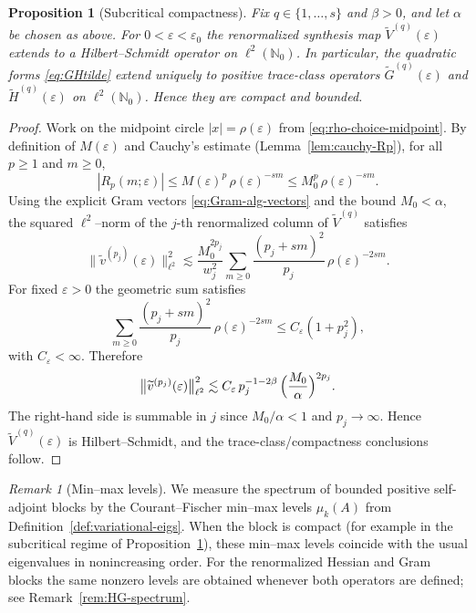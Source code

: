 \documentclass[11pt]{amsart}
\numberwithin{equation}{section}
\theoremstyle{plain}
\newtheorem{proposition}[theorem]{Proposition}
\theoremstyle{definition}
\theoremstyle{remark}
\newtheorem{remark}[theorem]{Remark}
\newcommand{\N}{\mathbb{N}}
\begin{document}
\begin{proposition}[Subcritical compactness]\label{prop:subcrit-compact}
	Fix $q\in\{1,\dots,s\}$ and $\beta>0$, and let $\alpha$ be chosen as above.
	For $0<\varepsilon<\varepsilon_0$ the renormalized synthesis map
	$\widetilde V^{(q)}(\varepsilon)$ extends to a Hilbert--Schmidt operator on $\ell^2(\N_0)$.
	In particular, the quadratic forms \eqref{eq:GHtilde} extend uniquely to positive trace-class operators
	$\widetilde G^{(q)}(\varepsilon)$ and $\widetilde H^{(q)}(\varepsilon)$ on $\ell^2(\N_0)$. Hence they are compact and bounded.
\end{proposition}

\begin{proof}
	Work on the midpoint circle $|x|=\rho(\varepsilon)$ from \eqref{eq:rho-choice-midpoint}.
	By definition of $M(\varepsilon)$ and Cauchy's estimate (Lemma~\ref{lem:cauchy-Rp}),
	for all $p\ge1$ and $m\ge0$,
	\[
		|R_p(m;\varepsilon)|
		\le M(\varepsilon)^p\,\rho(\varepsilon)^{-sm}
		\le M_0^p\,\rho(\varepsilon)^{-sm}.
	\]
	Using the explicit Gram vectors \eqref{eq:Gram-alg-vectors} and the bound $M_0<\alpha$,
	the squared $\ell^2$--norm of the $j$-th renormalized column of $\widetilde V^{(q)}$ satisfies
	\[
		\bigl\|\widetilde v^{(p_j)}(\varepsilon)\bigr\|_{\ell^2}^2
		\lesssim
		\frac{M_0^{2p_j}}{w_j^2}
		\sum_{m\ge0}\frac{(p_j+sm)^2}{p_j}\,\rho(\varepsilon)^{-2sm}.
	\]
	For fixed $\varepsilon>0$ the geometric sum satisfies
	\[
		\sum_{m\ge0}\frac{(p_j+sm)^2}{p_j}\,\rho(\varepsilon)^{-2sm}
		\le C_\varepsilon(1+p_j^2),
	\]
	with $C_\varepsilon<\infty$. Therefore
	\[
		\bigl\|\widetilde v^{(p_j)}(\varepsilon)\bigr\|_{\ell^2}^2
		\lesssim
	C_\varepsilon\,p_j^{-1-2\beta}\,\Bigl(\frac{M_0}{\alpha}\Bigr)^{2p_j}.
	\]
	The right-hand side is summable in $j$ since $M_0/\alpha<1$ and $p_j\to\infty$.
	Hence $\widetilde V^{(q)}(\varepsilon)$ is Hilbert--Schmidt, and the trace-class/compactness conclusions follow.
\end{proof}

\begin{remark}[Min--max levels]\label{rem:rayleigh}
	We measure the spectrum of bounded positive self-adjoint blocks by the
	Courant--Fischer min--max levels $\mu_k(A)$ from
	Definition~\ref{def:variational-eigs}. When the block is compact (for
	example in the subcritical regime of
	Proposition~\ref{prop:subcrit-compact}), these min--max levels coincide
	with the usual eigenvalues in nonincreasing order. For the renormalized
	Hessian and Gram blocks the same nonzero levels are obtained whenever both
	operators are defined; see Remark~\ref{rem:HG-spectrum}.
\end{remark}
\end{document}
